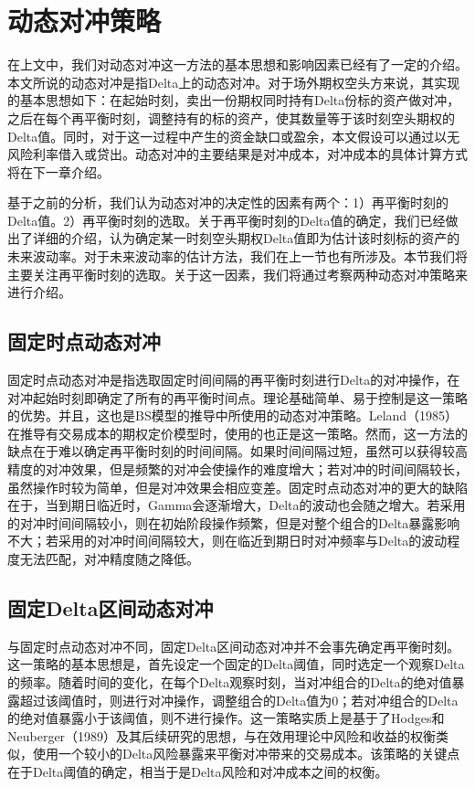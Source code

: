 \section{动态对冲策略}

在上文中，我们对动态对冲这一方法的基本思想和影响因素已经有了一定的介绍。本文所说的动态对冲是指Delta上的动态对冲。对于场外期权空头方来说，其实现的基本思想如下：在起始时刻，卖出一份期权同时持有Delta份标的资产做对冲，之后在每个再平衡时刻，调整持有的标的资产，使其数量等于该时刻空头期权的Delta值。同时，对于这一过程中产生的资金缺口或盈余，本文假设可以通过以无风险利率借入或贷出。动态对冲的主要结果是对冲成本，对冲成本的具体计算方式将在下一章介绍。

基于之前的分析，我们认为动态对冲的决定性的因素有两个：1）再平衡时刻的Delta值。2）再平衡时刻的选取。关于再平衡时刻的Delta值的确定，我们已经做出了详细的介绍，认为确定某一时刻空头期权Delta值即为估计该时刻标的资产的未来波动率。对于未来波动率的估计方法，我们在上一节也有所涉及。本节我们将主要关注再平衡时刻的选取。关于这一因素，我们将通过考察两种动态对冲策略来进行介绍。

\subsection{固定时点动态对冲}

固定时点动态对冲是指选取固定时间间隔的再平衡时刻进行Delta的对冲操作，在对冲起始时刻即确定了所有的再平衡时间点。理论基础简单、易于控制是这一策略的优势。并且，这也是BS模型的推导中所使用的动态对冲策略。Leland（1985）在推导有交易成本的期权定价模型时，使用的也正是这一策略。然而，这一方法的缺点在于难以确定再平衡时刻的时间间隔。如果时间间隔过短，虽然可以获得较高精度的对冲效果，但是频繁的对冲会使操作的难度增大；若对冲的时间间隔较长，虽然操作时较为简单，但是对冲效果会相应变差。固定时点动态对冲的更大的缺陷在于，当到期日临近时，Gamma会逐渐增大，Delta的波动也会随之增大。若采用的对冲时间间隔较小，则在初始阶段操作频繁，但是对整个组合的Delta暴露影响不大；若采用的对冲时间间隔较大，则在临近到期日时对冲频率与Delta的波动程度无法匹配，对冲精度随之降低。

\subsection{固定Delta区间动态对冲}

与固定时点动态对冲不同，固定Delta区间动态对冲并不会事先确定再平衡时刻。这一策略的基本思想是，首先设定一个固定的Delta阈值，同时选定一个观察Delta的频率。随着时间的变化，在每个Delta观察时刻，当对冲组合的Delta的绝对值暴露超过该阈值时，则进行对冲操作，调整组合的Delta值为0；若对冲组合的Delta的绝对值暴露小于该阈值，则不进行操作。这一策略实质上是基于了Hodges和Neuberger（1989）及其后续研究的思想，与在效用理论中风险和收益的权衡类似，使用一个较小的Delta风险暴露来平衡对冲带来的交易成本。该策略的关键点在于Delta阈值的确定，相当于是Delta风险和对冲成本之间的权衡。

